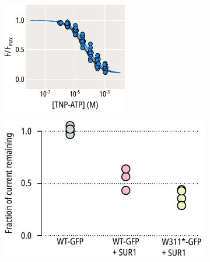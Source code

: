 \begin{figure}[hbtp]
\begin{subfigure}[t]{0.35\textwidth}
	\end{subfigure}
	\vfill
	\begin{subfigure}[t]{0.35\textwidth}
		\caption{}\label{ch6fig:nosur_unroofed}
		\centering
		\includegraphics[width=\textwidth]{nosur_unroofed.pdf}
	\end{subfigure}
	\hfill
	\begin{subfigure}[t]{0.45\textwidth}
		\caption{}\label{ch6fig:tolb_inhibition_1}
		\centering
		\includegraphics[width=\textwidth]{tolb_inhibition_1.pdf}
	\end{subfigure}
	\caption[SUR1 dramatically alters inhibition but only subtly alters binding at Kir6.2]{
	{\bf{}}
}
\end{figure}
